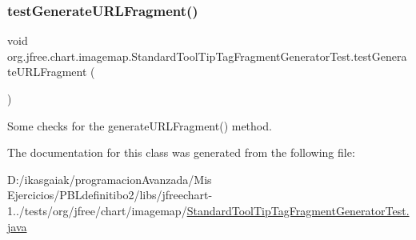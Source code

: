 \subsubsection{\texorpdfstring{test\+Generate\+U\+R\+L\+Fragment()}{testGenerateURLFragment()}}
{\footnotesize\ttfamily void org.\+jfree.\+chart.\+imagemap.\+Standard\+Tool\+Tip\+Tag\+Fragment\+Generator\+Test.\+test\+Generate\+U\+R\+L\+Fragment (\begin{DoxyParamCaption}{ }\end{DoxyParamCaption})}

Some checks for the generate\+U\+R\+L\+Fragment() method. 

The documentation for this class was generated from the following file\+:\begin{DoxyCompactItemize}
\item 
D\+:/ikasgaiak/programacion\+Avanzada/\+Mis Ejercicios/\+P\+B\+Ldefinitibo2/libs/jfreechart-\/1../tests/org/jfree/chart/imagemap/\mbox{\hyperlink{_standard_tool_tip_tag_fragment_generator_test_8java}{Standard\+Tool\+Tip\+Tag\+Fragment\+Generator\+Test.\+java}}\end{DoxyCompactItemize}
